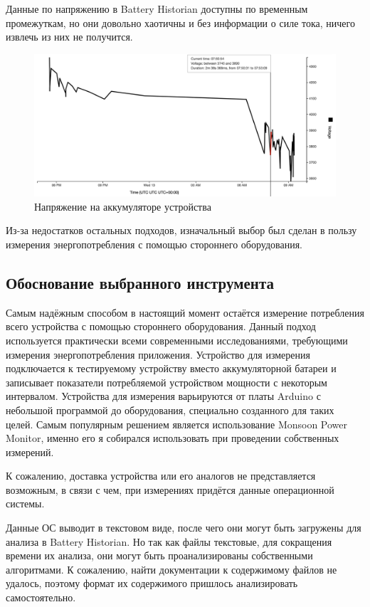 \documentclass[a4paper,14pt]{extarticle} %
\begin{document}
	Данные по напряжению в Battery Historian доступны по временным промежуткам, но они довольно хаотичны \ris{\ref{fig:historian_voltage}} и без информации о силе тока, ничего извлечь из них не получится.
	
	\begin{figure}[htb]
		\includegraphics[width=\textwidth]{historian_voltage}
		\caption{Напряжение на аккумуляторе устройства}
		\label{fig:historian_voltage}
	\end{figure}

	Из-за недостатков остальных подходов, изначальный выбор был сделан в пользу измерения энергопотребления с помощью стороннего оборудования.
	
	\subsection{Обоснование выбранного инструмента}
	
	Самым надёжным способом в настоящий момент остаётся измерение потребления всего устройства с помощью стороннего оборудования. Данный подход используется практически всеми современными исследованиями, требующими измерения энергопотребления приложения. Устройство для измерения подключается к тестируемому устройству вместо аккумуляторной батареи и записывает показатели потребляемой устройством мощности с некоторым интервалом. Устройства для измерения варьируются от платы Arduino с небольшой программой до оборудования, специально созданного для таких целей. Самым популярным решением является использование Monsoon Power Monitor, именно его я собирался использовать при проведении собственных измерений.
	
	К сожалению, доставка устройства или его аналогов не представляется возможным, в связи с чем, при измерениях придётся данные операционной системы.
	
	Данные ОС выводит в текстовом виде, после чего они могут быть загружены для анализа в Battery Historian. Но так как файлы текстовые, для сокращения времени их анализа, они могут быть проанализированы собственными алгоритмами. К сожалению, найти документации к содержимому файлов не удалось, поэтому формат их содержимого пришлось анализировать самостоятельно.
	
\end{document}
